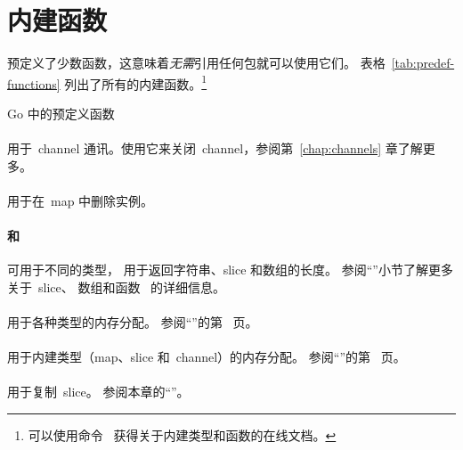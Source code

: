 \section{内建函数}
预定义了少数函数，这意味着\emph{无需}引用任何包就可以使用它们。
表格~\ref{tab:predef-functions} 列出了所有的内建函数。\footnote{可以使用命令~
 获得关于内建类型和函数的在线文档。}

\begin{table}[H]
\begin{center}
\caption{Go 中的预定义函数}
\label{tab:predef-functions}

\end{center}
\end{table}

\paragraph{} 用于~channel
通讯。使用它来关闭~channel，参阅第~\ref{chap:channels} 章了解更多。

\paragraph{} 用于在~map 中删除实例。

\paragraph{ 和~} 可用于不同的类型，
 用于返回字符串、slice 和数组的长度。
参阅``''小节了解更多关于~slice、
数组和函数~ 的详细信息。

\paragraph{} 用于各种类型的内存分配。
参阅``''的第~\pageref{sec:allocation with new} 页。

\paragraph{} 用于内建类型（map、slice 和~channel）的内存分配。
参阅``''的第~\pageref{sec:allocation with make} 页。

\paragraph{} 用于复制~slice。
参阅本章的``''。

